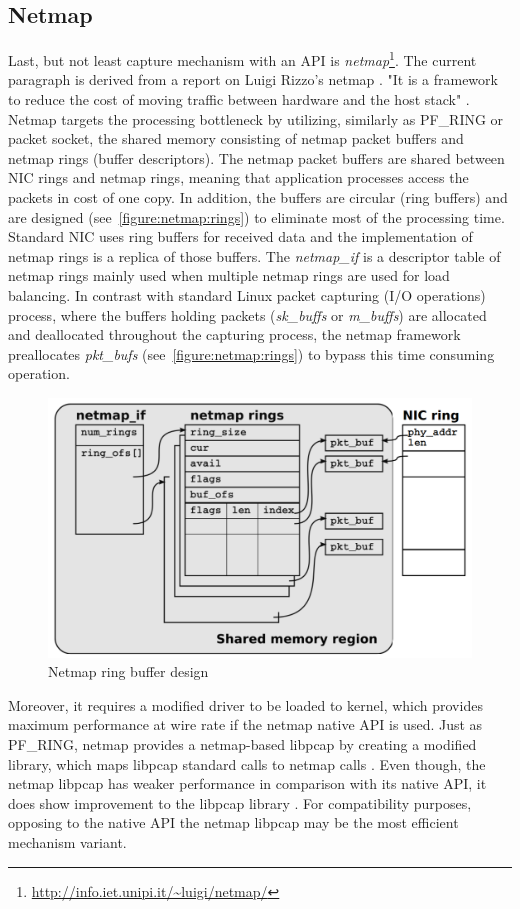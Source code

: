 \documentclass[12pt,a4paper,twoside]{report}
\begin{document}
		\subsection{Netmap} \label{analysis:mechs:netmap}
			Last, but not least capture mechanism with an API is \emph{netmap}\footnote{\url{http://info.iet.unipi.it/~luigi/netmap/}}. The current paragraph is derived from a report on Luigi Rizzo's netmap \cite{report:netmap}. "It is a framework to reduce the cost of moving traffic between hardware and the host stack" \cite{report:netmap}. Netmap targets the processing bottleneck by utilizing, similarly as PF\_RING or packet socket, the shared memory consisting of netmap packet buffers and netmap rings (buffer descriptors). The netmap packet buffers are shared between NIC rings and netmap rings, meaning that application processes access the packets in cost of one copy. In addition, the buffers are circular (ring buffers) and are designed (see~\autoref{figure:netmap:rings}) to eliminate most of the processing time. Standard NIC uses ring buffers for received data and the implementation of netmap rings is a replica of those buffers. The \emph{netmap\_if} is a descriptor table of netmap rings mainly used when multiple netmap rings are used for load balancing. In contrast with standard Linux packet capturing (I/O operations) process, where the buffers holding packets (\emph{sk\_buffs} or \emph{m\_buffs}) are allocated and deallocated throughout the capturing process, the netmap framework preallocates \emph{pkt\_bufs} (see~\autoref{figure:netmap:rings}) to bypass this time consuming operation.\par
			\begin{figure}
				\centering
				\includegraphics[scale=0.3]{netmap_rings}
				\caption{Netmap ring buffer design}
				\label{figure:netmap:rings}
			\end{figure}
			Moreover, it requires a modified driver to be loaded to kernel, which provides maximum performance at wire rate if the netmap native API is used. Just as PF\_RING, netmap provides a netmap-based libpcap by creating a modified library, which maps libpcap standard calls to netmap calls \cite{report:netmap}. Even though, the netmap libpcap has weaker performance in comparison with its native API, it does show improvement to the libpcap library \cite{video:netmap}. For compatibility purposes, opposing to the native API the netmap libpcap may be the most efficient mechanism variant.
\end{document}

